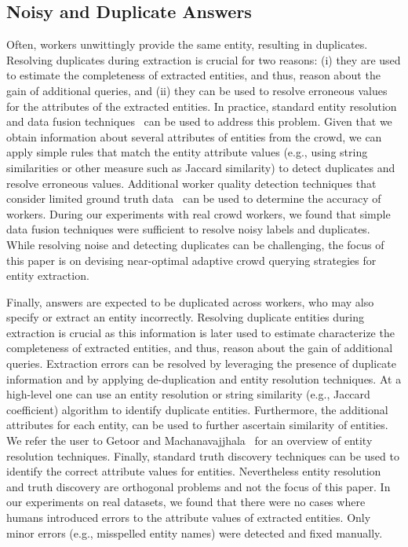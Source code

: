 \subsection{Noisy and Duplicate Answers} 
Often, workers unwittingly provide the same entity, resulting in duplicates. Resolving duplicates during extraction is crucial for two reasons: (i) they are used to estimate the completeness of extracted entities, and thus, reason about the gain of additional queries, and (ii) they can be used to resolve erroneous values for the attributes of the extracted entities. In practice, standard entity resolution and data fusion techniques~\cite{getoor:kdd13} can be used to address this problem. Given that we obtain information about several attributes of entities from the crowd, we can apply simple rules that match the entity attribute values (e.g., using string similarities or other measure such as Jaccard similarity) to detect duplicates and resolve erroneous values. Additional worker quality detection techniques that consider limited ground truth data~\cite{donmez-learning-inference} can be used to determine the accuracy of workers. During our experiments with real crowd workers, we found that simple data fusion techniques were sufficient to resolve noisy labels and duplicates. While resolving noise and detecting duplicates can be challenging, the focus of this paper is on devising near-optimal adaptive crowd querying strategies for entity extraction. 

\iftr
Finally, answers are expected to be duplicated across workers, who may also specify or extract an entity incorrectly. Resolving duplicate entities during extraction is crucial as this information is later used to estimate characterize the completeness of extracted entities, and thus, reason about the gain of additional queries.  Extraction errors can be resolved by leveraging the presence of duplicate information and by applying de-duplication and entity resolution techniques. At a high-level one can use an entity resolution or string similarity (e.g., Jaccard coefficient) algorithm to identify duplicate entities. Furthermore, the additional attributes for each entity, can be used to further ascertain similarity of entities. We refer the user to Getoor and Machanavajjhala~\cite{getoor:kdd13} for an overview of entity resolution techniques. Finally, standard truth discovery techniques can be used to identify the correct attribute values for entities. Nevertheless entity resolution and truth discovery are orthogonal problems and not the focus of this paper. In our experiments on real datasets, we found that there were no cases where humans introduced errors to the attribute values of extracted entities. Only minor errors (e.g., misspelled entity names) were detected and fixed manually. \fi

